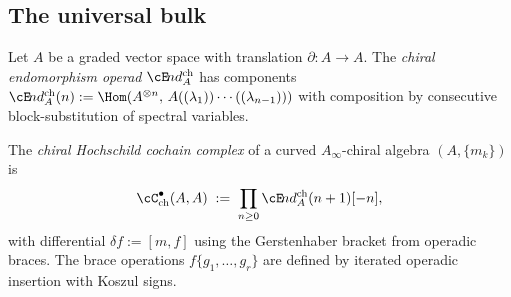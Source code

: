 \subsection{The universal bulk}

\begin{definition}
\label{def:chiral-endomorphism-operad-v2}
Let $A$ be a graded vector space with translation
$\partial \colon A \to A$. The \emph{chiral endomorphism operad}
$\cE\!nd^{\mathrm{ch}}_A$ has components
$\cE\!nd^{\mathrm{ch}}_A(n)
:= \Hom(A^{\otimes n},\,
A((\lambda_1))\cdots((\lambda_{n-1})))$
with composition by consecutive block-substitution of spectral
variables.
\end{definition}

\begin{definition}
\label{def:chiral-hochschild-v2}
The \emph{chiral Hochschild cochain complex} of a curved
$A_\infty$-chiral algebra $(A, \{m_k\})$ is
\[
 \cC^\bullet_{\mathrm{ch}}(A, A)
 \;:=\;
 \prod_{n \ge 0}
 \cE\!nd^{\mathrm{ch}}_A(n+1)[-n],
\]
with differential $\delta f := [m, f]$ using the Gerstenhaber
bracket from operadic braces. The brace operations
$f\{g_1, \ldots, g_r\}$ are defined by iterated operadic
insertion with Koszul signs.
\end{definition}

